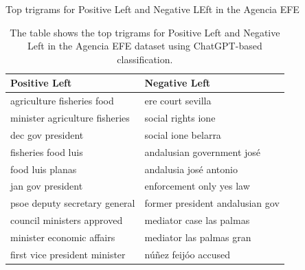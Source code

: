 \documentclass[12pt]{article}
\begin{document}
	\begin{table}[!htb]
		\caption{Top trigrams for Positive Left and Negative LEft in the Agencia EFE}
		\centering
		\begin{tabular}{|l|l|}
			\hline
			Positive Left & Negative Left \\
			\hline
			agriculture fisheries food & ere court sevilla \\
			minister agriculture fisheries & social rights ione \\
			dec gov president & social ione belarra \\
			fisheries food luis & andalusian government josé \\
			food luis planas & andalusia josé antonio \\
			jan gov president & enforcement only yes law \\
			psoe deputy secretary general & former president andalusian gov \\
			council ministers approved & mediator case las palmas \\
			minister economic affairs & mediator las palmas gran \\
			first vice president minister & núñez feijóo accused \\
			\hline
		\end{tabular}
		\caption*{The table shows the top trigrams for Positive Left and Negative Left in the Agencia EFE dataset using ChatGPT-based classification.}
		\label{tab:top_words_pos_left_neg_left}
	\end{table}
	
	
	
	
	
	
\clearpage
\end{document}
